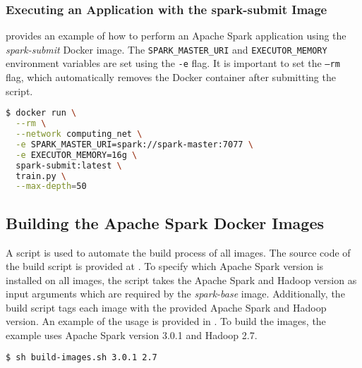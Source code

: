 \subsubsection{Executing an Application with the spark-submit Image}
% 
 provides an example of how to perform an Apache Spark application using the \textit{spark-submit} Docker image.
The \texttt{SPARK\_MASTER\_URI} and \texttt{EXECUTOR\_MEMORY} environment variables are set using the \texttt{-e} flag.
%
It is important to set the \texttt{--rm} flag, which automatically removes the Docker container after submitting the script.
\begin{lstlisting}[label=lst:06_env_depl_submit_example, caption=Example of the spark-submit image, language=bash, numbers=none]
$ docker run \
  --rm \
  --network computing_net \
  -e SPARK_MASTER_URI=spark://spark-master:7077 \
  -e EXECUTOR_MEMORY=16g \
  spark-submit:latest \
  train.py \
  --max-depth=50
\end{lstlisting}


\subsection{Building the Apache Spark Docker Images}
\label{subsec:07_spark_building-images}
A script is used to automate the build process of all images.
The source code of the build script is provided at .
To specify which Apache Spark version is installed on all images, the script takes the Apache Spark and Hadoop version as input arguments which are required by the \textit{spark-base} image.
Additionally, the build script tags each image with the provided Apache Spark and Hadoop version.
An example of the usage is provided in .
To build the images, the example uses Apache Spark version 3.0.1 and Hadoop 2.7.
\begin{lstlisting}[label=lst:06_env_depl_build_example, caption=Example of the spark-submit image, language=bash, numbers=none]
$ sh build-images.sh 3.0.1 2.7
\end{lstlisting}


